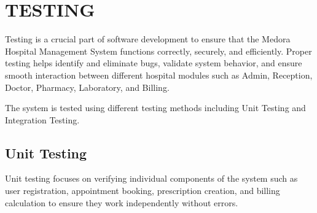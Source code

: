 \chapter{TESTING}

Testing is a crucial part of software development to ensure that the Medora Hospital Management System functions correctly, securely, and efficiently. Proper testing helps identify and eliminate bugs, validate system behavior, and ensure smooth interaction between different hospital modules such as Admin, Reception, Doctor, Pharmacy, Laboratory, and Billing.

The system is tested using different testing methods including Unit Testing and Integration Testing.

\section{Unit Testing}

Unit testing focuses on verifying individual components of the system such as user registration, appointment booking, prescription creation, and billing calculation to ensure they work independently without errors.

\renewcommand{\arraystretch}{1.3}

